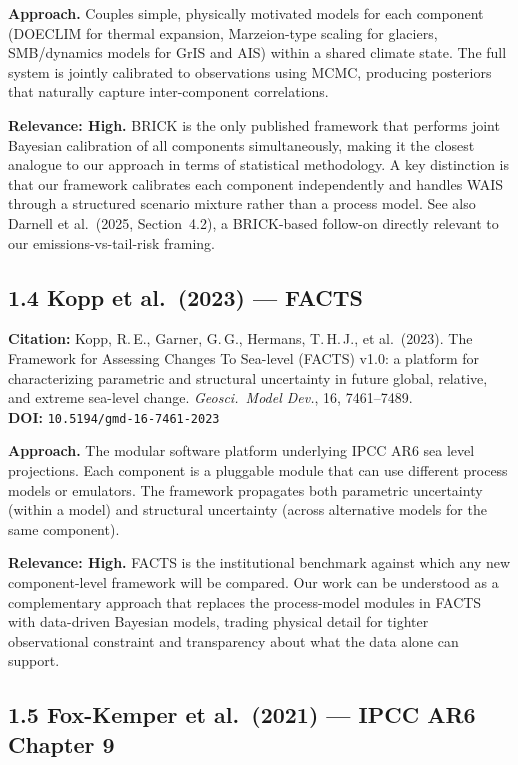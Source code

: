 \documentclass[11pt]{article}
\begin{document}
\noindent\textbf{Approach.} Couples simple, physically motivated models for
each component (DOECLIM for thermal expansion, Marzeion-type scaling for
glaciers, SMB/dynamics models for GrIS and AIS) within a shared climate
state. The full system is jointly calibrated to observations using MCMC,
producing posteriors that naturally capture inter-component correlations.

\noindent\textbf{Relevance: High.} BRICK is the only published framework
that performs joint Bayesian calibration of all components simultaneously,
making it the closest analogue to our approach in terms of statistical
methodology. A key distinction is that our framework calibrates each
component independently and handles WAIS through a structured scenario
mixture rather than a process model. See also Darnell et al.\ (2025,
Section~4.2), a BRICK-based follow-on directly relevant to our
emissions-vs-tail-risk framing.

\subsection*{1.4 Kopp et al.\ (2023) --- FACTS}

\noindent\textbf{Citation:} Kopp, R.\,E., Garner, G.\,G.,
Hermans, T.\,H.\,J., et al.\ (2023). The Framework for Assessing Changes
To Sea-level (FACTS) v1.0: a platform for characterizing parametric and
structural uncertainty in future global, relative, and extreme sea-level
change. \textit{Geosci.\ Model Dev.}, 16, 7461--7489.\\
\textbf{DOI:} \texttt{10.5194/gmd-16-7461-2023}

\noindent\textbf{Approach.} The modular software platform underlying IPCC
AR6 sea level projections. Each component is a pluggable module that can use
different process models or emulators. The framework propagates both
parametric uncertainty (within a model) and structural uncertainty (across
alternative models for the same component).

\noindent\textbf{Relevance: High.} FACTS is the institutional benchmark
against which any new component-level framework will be compared. Our work
can be understood as a complementary approach that replaces the
process-model modules in FACTS with data-driven Bayesian models, trading
physical detail for tighter observational constraint and transparency about
what the data alone can support.

\subsection*{1.5 Fox-Kemper et al.\ (2021) --- IPCC AR6 Chapter 9}
\end{document}
